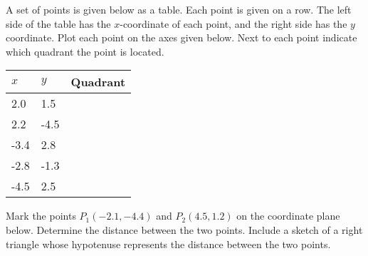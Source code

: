 \begin{problem}
\item A set of points is given below as a table. Each point is given
  on a row. The left side of the table has the $x$-coordinate of each
  point, and the right side has the $y$ coordinate. Plot each point on
  the axes given below. Next to each point indicate which quadrant the
  point is located.

  \begin{tabular}{l|ll}
    $x$ & $y$ & Quadrant \\ \hline
     2.0 &  1.5 & \\ [10pt]
     2.2 & -4.5 & \\ [10pt]
    -3.4 &  2.8 & \\ [10pt]
    -2.8 & -1.3 & \\ [10pt]
    -4.5 &  2.5 & \\ [10pt]
  \end{tabular}


  \vfill

  \clearpage

\item Mark the points $P_1(-2.1,-4.4)$ and $P_2(4.5,1.2)$ on the coordinate plane
  below. Determine the distance between the two points.  Include a
  sketch of a right triangle whose hypotenuse represents the distance
  between the two points.


\end{problem}
